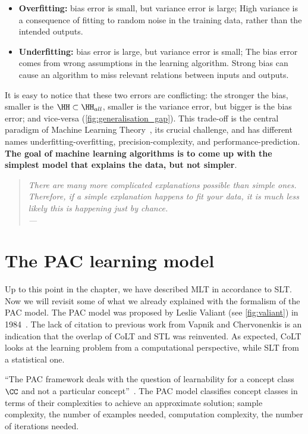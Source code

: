 \begin{itemize}
	\item \textbf{Overfitting:} bias error is small, but variance error is large; High variance is a consequence of fitting to random noise in the training data, rather than the intended outputs.
	\item \textbf{Underfitting:} bias error is large, but variance error is small; The bias error comes from wrong assumptions in the learning algorithm. Strong bias can cause an algorithm to miss relevant relations between inputs and outputs.
\end{itemize}
It is easy to notice that these two errors are conflicting: the stronger the bias, smaller is the \(\HH \subset \HH_{all}\), smaller is the variance error, but bigger is the bias error; and vice-versa (\cref{fig:generalisation_gap}). This trade-off is the central paradigm of Machine Learning Theory~\cite{slonim:2002}, its crucial challenge, and has different names underfitting-overfitting, precision-complexity, and performance-prediction.
\textbf{The goal of machine learning algorithms is to come up with the simplest model that explains the data, but not simpler}.
\begin{quotation}
	\small \textit{ \flushright There are many more complicated explanations possible than simple ones. Therefore, if a simple explanation happens to fit your data, it is much less likely this is happening just by chance.\\
	\flushright ---~\citeauthor{blum:2007}\\
	}
\end{quotation}
\section{The PAC learning model}
Up to this point in the chapter, we have described MLT in accordance to \ac{SLT}. Now we will revisit some of what we already explained with the formalism of the PAC model.
The PAC model was proposed by Leslie Valiant (see \cref{fig:valiant}) in 1984~\cite{valiant:1984}. The lack of citation to previous work from Vapnik and Chervonenkis is an indication that the overlap of CoLT and STL was reinvented. As expected, CoLT looks at the learning problem from a computational perspective, while SLT from a statistical one.

``The PAC framework deals with the question of learnability for a concept class \(\CC\) and not a particular concept''~\cite{mohri:2012}. The PAC model classifies concept classes in terms of their complexities to achieve an approximate solution; sample complexity, the number of examples needed, computation complexity, the number of iterations needed.

